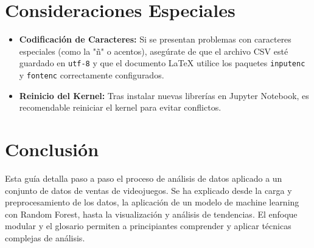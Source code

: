 \documentclass[12pt]{article}
\begin{document}
\section{Consideraciones Especiales}
\begin{itemize}
    \item \textbf{Codificación de Caracteres:} Si se presentan problemas con caracteres especiales (como la "ñ" o acentos), asegúrate de que el archivo CSV esté guardado en \texttt{utf-8} y que el documento LaTeX utilice los paquetes \texttt{inputenc} y \texttt{fontenc} correctamente configurados.
    \item \textbf{Reinicio del Kernel:} Tras instalar nuevas librerías en Jupyter Notebook, es recomendable reiniciar el kernel para evitar conflictos.
\end{itemize}

\section{Conclusión}
Esta guía detalla paso a paso el proceso de análisis de datos aplicado a un conjunto de datos de ventas de videojuegos. Se ha explicado desde la carga y preprocesamiento de los datos, la aplicación de un modelo de machine learning con Random Forest, hasta la visualización y análisis de tendencias. El enfoque modular y el glosario permiten a principiantes comprender y aplicar técnicas complejas de análisis.
\end{document}
